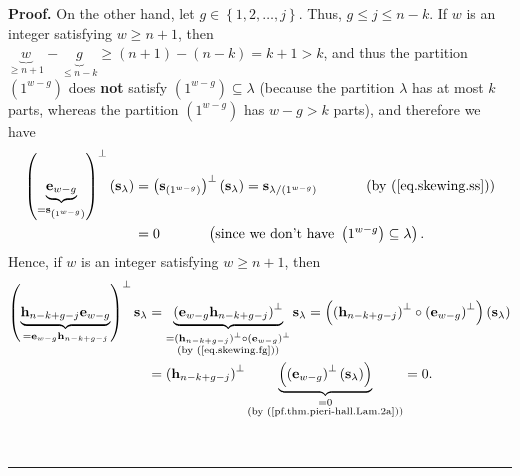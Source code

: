 \documentclass[numbers=enddot,12pt,final,onecolumn,notitlepage]{scrartcl}%
\theoremstyle{definition}
\newenvironment{proof}[1][Proof]{\noindent\textbf{#1.} }{\ \rule{0.5em}{0.5em}}
\begin{document}
\begin{proof}
On the other hand, let $g\in\left\{  1,2,\ldots,j\right\}  $. Thus, $g\leq
j\leq n-k$. If $w$ is an integer satisfying $w\geq n+1$, then $\underbrace{w}%
_{\geq n+1}-\underbrace{g}_{\leq n-k}\geq\left(  n+1\right)  -\left(
n-k\right)  =k+1>k$, and thus the partition $\left(  1^{w-g}\right)  $ does
\textbf{not} satisfy $\left(  1^{w-g}\right)  \subseteq\lambda$ (because the
partition $\lambda$ has at most $k$ parts, whereas the partition $\left(
1^{w-g}\right)  $ has $w-g>k$ parts), and therefore we have
\begin{align}
\left(  \underbrace{\mathbf{e}_{w-g}}_{=\mathbf{s}_{\left(  1^{w-g}\right)  }%
}\right)  ^{\perp}\left(  \mathbf{s}_{\lambda}\right)   &  =\left(
\mathbf{s}_{\left(  1^{w-g}\right)  }\right)  ^{\perp}\left(  \mathbf{s}%
_{\lambda}\right)  =\mathbf{s}_{\lambda/\left(  1^{w-g}\right)  }%
\ \ \ \ \ \ \ \ \ \ \left(  \text{by (\ref{eq.skewing.ss})}\right) \nonumber\\
&  =0\ \ \ \ \ \ \ \ \ \ \left(  \text{since we don't have }\left(
1^{w-g}\right)  \subseteq\lambda\right)  . \label{pf.thm.pieri-hall.Lam.2a}%
\end{align}
Hence, if $w$ is an integer satisfying $w\geq n+1$, then%
\begin{align}
\left(  \underbrace{\mathbf{h}_{n-k+g-j}\mathbf{e}_{w-g}}_{=\mathbf{e}%
_{w-g}\mathbf{h}_{n-k+g-j}}\right)  ^{\perp}\mathbf{s}_{\lambda}  &
=\underbrace{\left(  \mathbf{e}_{w-g}\mathbf{h}_{n-k+g-j}\right)  ^{\perp}%
}_{\substack{=\left(  \mathbf{h}_{n-k+g-j}\right)  ^{\perp}\circ\left(
\mathbf{e}_{w-g}\right)  ^{\perp}\\\text{(by (\ref{eq.skewing.fg}))}%
}}\mathbf{s}_{\lambda}=\left(  \left(  \mathbf{h}_{n-k+g-j}\right)  ^{\perp
}\circ\left(  \mathbf{e}_{w-g}\right)  ^{\perp}\right)  \left(  \mathbf{s}%
_{\lambda}\right) \nonumber\\
&  =\left(  \mathbf{h}_{n-k+g-j}\right)  ^{\perp}\underbrace{\left(  \left(
\mathbf{e}_{w-g}\right)  ^{\perp}\left(  \mathbf{s}_{\lambda}\right)  \right)
}_{\substack{=0\\\text{(by (\ref{pf.thm.pieri-hall.Lam.2a}))}}}=0.
\label{pf.thm.pieri-hall.Lam.2b}%
\end{align}



\end{proof}
\end{document}
